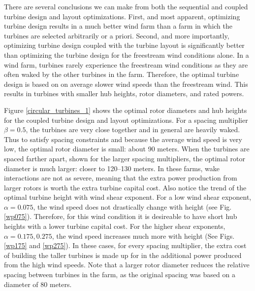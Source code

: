 There are several conclusions we can make from both the sequential and coupled turbine design and layout optimizations. First, and most apparent, optimizing turbine design results in a much better wind farm than a farm in which the turbines are selected arbitrarily or a priori. Second, and more importantly, optimizing turbine design coupled with the turbine layout is significantly better than optimizing the turbine design for the freestream wind conditions alone. In a wind farm, turbines rarely experience the freestream wind conditions as they are often waked by the other turbines in the farm. Therefore, the optimal turbine design is based on on average slower wind speeds than the freestream wind. This results in turbines with smaller hub heights, rotor diameters, and rated powers. 

Figure \ref{circular_turbines_1} shows the optimal rotor diameters and hub heights for the coupled turbine design and layout optimizations. For a spacing multiplier $\beta=0.5$, the turbines are very close together and in general are heavily waked. Thus to satisfy spacing constraints and because the average wind speed is very low, the optimal rotor diameter is small: about 90 meters. When the turbines are spaced farther apart, shown for the larger spacing multipliers, the optimal rotor diameter is much larger: closer to 120--130 meters. In these farms, wake interactions are not as severe, meaning that the extra power production from larger rotors is worth the extra turbine capital cost. Also notice the trend of the optimal turbine height with wind shear exponent. For a low wind shear exponent, $\alpha=0.075$, the wind speed does not drastically change with height (see Fig. \ref{wp075}). Therefore, for this wind condition it is desireable to have short hub heights with a lower turbine capital cost. For the higher shear exponents, $\alpha=0.175,0.275$, the wind speed increases much more with height (See Figs. \ref{wp175} and \ref{wp275}). In these cases, for every spacing multiplier, the extra cost of building the taller turbines is made up for in the additional power produced from the high wind speeds. Note that a larger rotor diameter reduces the relative spacing between turbines in the farm, as the original spacing was based on a diameter of 80 meters.


